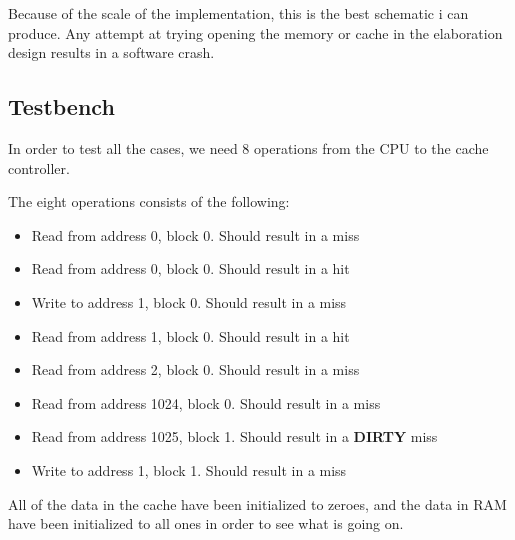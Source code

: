 \documentclass{article}
\begin{document}
Because of the scale of the implementation, this is the best schematic i can produce. Any attempt at trying opening the memory or cache in the elaboration design results in a software crash.

\subsection{Testbench}

In order to test all the cases, we need 8 operations from the CPU to the cache controller.

The eight operations consists of the following:
\begin{itemize}
  \item{Read from address 0, block 0. Should result in a miss}
  \item{Read from address 0, block 0. Should result in a hit}
  \item{Write to address 1, block 0. Should result in a miss}
  \item{Read from address 1, block 0. Should result in a hit}
  \item{Read from address 2, block 0. Should result in a miss}
  \item{Read from address 1024, block 0. Should result in a miss}
  \item{Read from address 1025, block 1. Should result in a \textbf{DIRTY} miss}
  \item{Write to address 1, block 1. Should result in a miss}
\end{itemize}

All of the data in the cache have been initialized to zeroes, and the data in RAM have been initialized to all ones in order to see what is going on.
\end{document}
